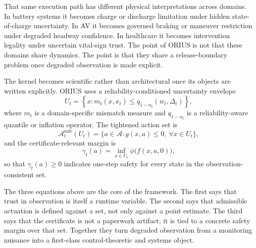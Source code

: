That same execution path has different physical interpretations across domains. In
battery systems it becomes charge or discharge limitation under hidden state-of-charge
uncertainty. In AV it becomes governed braking or maneuver restriction under degraded
headway confidence. In healthcare it becomes intervention legality under uncertain
vital-sign trust. The point of ORIUS is not that these domains share dynamics. The
point is that they share a release-boundary problem once degraded observation is made
explicit.

The kernel becomes scientific rather than architectural once its objects are written
explicitly. ORIUS uses a reliability-conditioned uncertainty envelope
\begin{equation}
  U_t
  =
  \left\{
    x :
    m_t(x,\hat{x}_t) \le q_{1-\alpha_t}(w_t,\Delta_t)
  \right\},
\end{equation}
where \(m_t\) is a domain-specific mismatch measure and \(q_{1-\alpha_t}\) is a
reliability-aware quantile or inflation operator. The tightened action set is
\begin{equation}
  \mathcal{A}^{\mathrm{safe}}_t(U_t)
  =
  \{a \in \mathcal{A}: g(x,a)\le 0,\ \forall x \in U_t\},
\end{equation}
and the certificate-relevant margin is
\begin{equation}
  \gamma_t(a)
  =
  \inf_{x \in U_t} \phi\!\bigl(f(x,a,0)\bigr),
\end{equation}
so that \(\gamma_t(a) \ge 0\) indicates one-step safety for every state in the
observation-consistent set.

The three equations above are the core of the framework. The first says that trust in
observation is itself a runtime variable. The second says that admissible actuation is
defined against a set, not only against a point estimate. The third says that the
certificate is not a paperwork artifact; it is tied to a concrete safety margin over
that set. Together they turn degraded observation from a monitoring nuisance into a
first-class control-theoretic and systems object.

